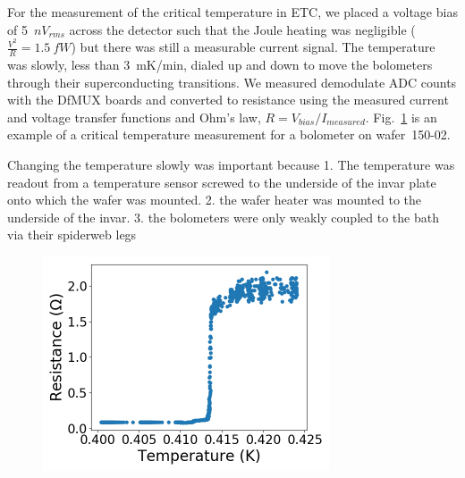 For the measurement of the critical temperature in \ac{ETC}, we placed a voltage bias of 5~$nV_{rms}$ across the detector such that the Joule heating was negligible ($\frac{V^2}{R} = 1.5~fW$) but there was still a measurable current signal. 
The temperature was slowly, less than 3~mK/min, dialed up and down to move the bolometers through their superconducting transitions. 
We measured demodulate \ac{ADC} counts with the \ac{DfMUX} boards and converted to resistance using the measured current and voltage transfer functions and Ohm's law, $R=V_{bias}/I_{measured}$.
Fig.~\ref{fig:tc_measurement} is an example of a critical temperature measurement for a bolometer on wafer~150-02. 

Changing the temperature slowly was important because
1. The temperature was readout from a temperature sensor screwed to the underside of the invar plate onto which the wafer was mounted. 
2. the wafer heater was mounted to the underside of the invar. 
3. the bolometers were only weakly coupled to the bath via their spiderweb legs 




\begin{figure}[htbp]
\begin{center}
\includegraphics[height=2.5in]{figures/b53w0c0_rvst.png}
\caption{
\label{fig:tc_measurement} }
\end{center}
\end{figure} 

